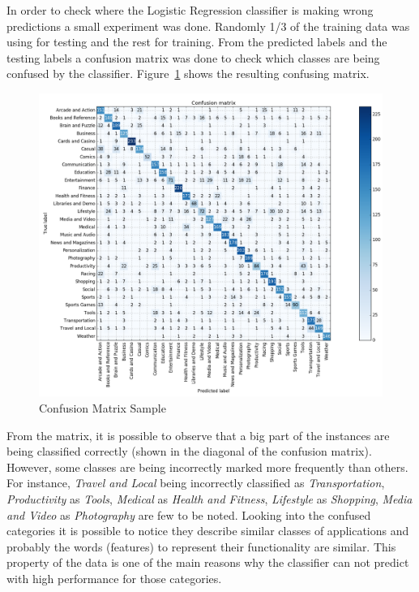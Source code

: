 \documentclass[letterpaper,10pt]{article}
\theoremstyle{mytheor}
\begin{document}
In order to check where the Logistic Regression classifier is making wrong predictions a small experiment was done. Randomly 1/3 of the training data was using for testing and the rest for training. From the predicted labels and the testing labels a confusion matrix was done to check which classes are being confused by the classifier. Figure~\ref{fig:4} shows the resulting confusing matrix.

\begin{figure}[H]
\includegraphics[width=\textwidth]{cm}
\centering
\caption{Confusion Matrix Sample}
\label{fig:4}
\end{figure}

From the matrix, it is possible to observe that a big part of the instances are being classified correctly (shown in the diagonal of the confusion matrix). However, some classes are being incorrectly marked more frequently than others. For instance, \textit{Travel and Local} being incorrectly classified as \textit{Transportation}, \textit{Productivity} as \textit{Tools}, \textit{Medical} as \textit{Health and Fitness}, \textit{Lifestyle} as \textit{Shopping}, \textit{Media and Video} as \textit{Photography} are few to be noted. Looking into the confused categories it is possible to notice they describe similar classes of applications and probably the words (features) to represent their functionality are similar. This property of the data is one of the main reasons why the classifier can not predict with high performance for those categories.    
\end{document}
